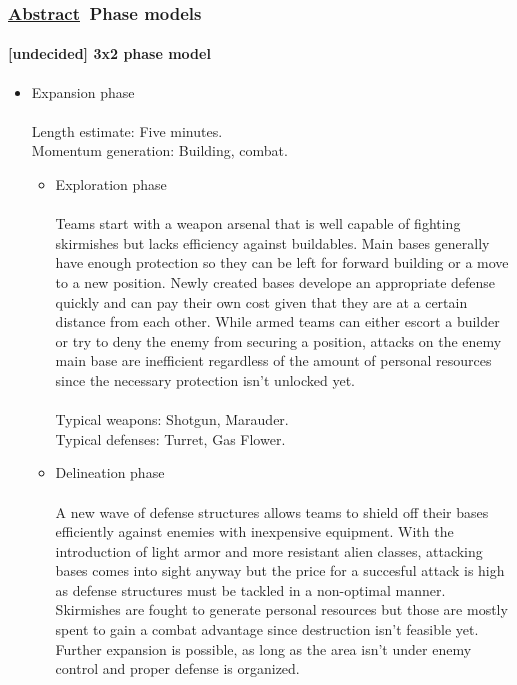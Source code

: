\documentclass{scrartcl}
\newcommand{\abstrac}  [0]{\textbf{\underline{Abstract}\ }}
\newcommand{\undecided}[0]{\textcolor{undecided}{\textbf{[undecided] }}}
\begin{document}
\subsubsection{\abstrac Phase models}

\paragraph{\undecided 3x2 phase model}

\begin{itemize}
	\item Expansion phase \\\\
		Length estimate: Five minutes. \\
		Momentum generation: Building, combat. \\
		\begin{itemize}
		\item Exploration phase \\\\
			Teams start with a weapon arsenal that is well capable of fighting skirmishes but lacks efficiency against buildables. Main bases generally have enough protection so they can be left for forward building or a move to a new position. Newly created bases develope an appropriate defense quickly and can pay their own cost given that they are at a certain distance from each other. While armed teams can either escort a builder or try to deny the enemy from securing a position, attacks on the enemy main base are inefficient regardless of the amount of personal resources since the necessary protection isn't unlocked yet. \\\\
			Typical weapons: Shotgun, Marauder. \\
			Typical defenses: Turret, Gas Flower. \\
		\item Delineation phase \\\\
			A new wave of defense structures allows teams to shield off their bases efficiently against enemies with inexpensive equipment. With the introduction of light armor and more resistant alien classes, attacking bases comes into sight anyway but the price for a succesful attack is high as defense structures must be tackled in a non-optimal manner. Skirmishes are fought to generate personal resources but those are mostly spent to gain a combat advantage since destruction isn't feasible yet. Further expansion is possible, as long as the area isn't under enemy control and proper defense is organized. \\\\

\end{itemize}
\end{itemize}
\end{document}
